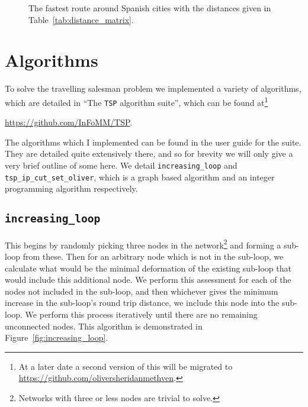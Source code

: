\documentclass[a4paper, 11pt]{article}
\begin{document}
\begin{figure}[htb]
\begin{center}
\caption{The fastest route around Spanish cities with the distances given in Table~\ref{tab:distance_matrix}.}
\label{fig:fastest_route_around_spannish_cities}
\end{center}
\end{figure}

\section{Algorithms}
\label{sec:Algorithms}

To solve the travelling salesman problem we implemented a variety of algorithms, which are detailed in ``The \texttt{TSP} algorithm suite'', which can be found at\footnote{At a later date a second version of this will be migrated to \href{https://github.com/oliversheridanmethven}{https://github.com/oliversheridanmethven}.}
\begin{center}
\href{https://github.com/InFoMM/TSP}{https://github.com/InFoMM/TSP}.
\end{center}

The algorithms which I implemented can be found in the user guide for the suite. They are detailed quite extensively there, and so for brevity we will only give a very brief outline of some here. We detail \verb|increasing_loop| and \verb|tsp_ip_cut_set_oliver|, which is a graph based algorithm and an integer programming algorithm respectively.

\subsection{\texttt{increasing\_loop}}
\label{subsec:increasing_loop}

This begins by randomly picking three nodes in the network\footnote{Networks with three or less nodes are trivial to solve.} and forming a sub-loop from these. Then for an arbitrary node which is not in the sub-loop, we calculate what would be the minimal deformation of the existing sub-loop that would include this additional node. We perform this assessment for each of the nodes not included in the sub-loop, and then whichever gives the minimum increase in the sub-loop's round trip distance, we include this node into the sub-loop. We perform this process iteratively until there are no remaining unconnected nodes. This algorithm is demonstrated in Figure~\ref{fig:increasing_loop}.
\end{document}
